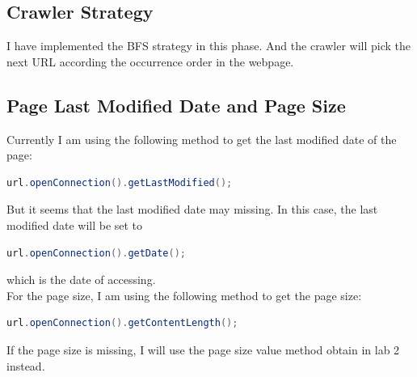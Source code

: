 \documentclass{article}
\begin{document}
        \subsection*{Crawler Strategy}
            I have implemented the BFS strategy in this phase. And the crawler will pick the next URL according the occurrence order in the webpage.
        \subsection*{Page Last Modified Date and Page Size}
            Currently I am using the following method to get the last modified date of the page:
            \begin{lstlisting}[language=Java]
                url.openConnection().getLastModified();
            \end{lstlisting}
            But it seems that the last modified date may missing. In this case, the last modified date will be set to 
            \begin{lstlisting}[language=Java]
                url.openConnection().getDate();
            \end{lstlisting}
            which is the date of accessing. \\[0.4em]
            For the page size, I am using the following method to get the page size:
            \begin{lstlisting}[language=Java]
                url.openConnection().getContentLength();
            \end{lstlisting}
            If the page size is missing, I will use the page size value method obtain in lab 2 instead.
        
            
\end{document}
